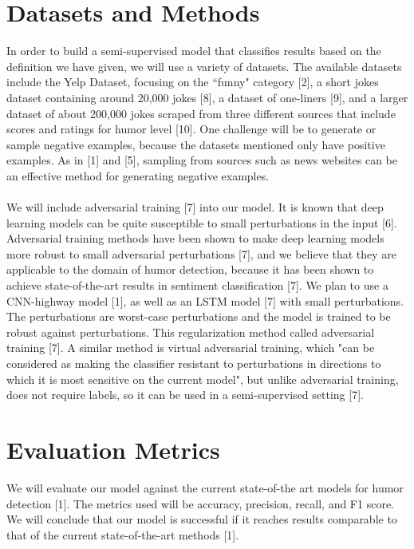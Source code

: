 \documentclass{article}
\begin{document}
\section{Datasets and Methods}
         In order to build a semi-supervised model that classifies results based on the definition we have given, we will use a variety of datasets. 
         The available datasets include the Yelp Dataset, focusing on the ``funny" category [2], a short jokes dataset containing around 20,000 jokes [8], a dataset of one-liners [9], and a larger dataset of about 200,000 jokes scraped from three different sources that include scores and ratings for humor level [10]. One challenge will be to generate or sample negative examples, because the datasets mentioned only have positive examples. As in [1] and [5], sampling from sources such as news websites can be an effective method for generating negative examples.
        \\\\
        We will include adversarial training [7] into our model. It is known that deep learning models can be quite susceptible to small perturbations in the input [6]. Adversarial training methods have been shown to make deep learning models more robust to small adversarial perturbations [7], and we believe that they are applicable to the domain of humor detection, because it has been shown to achieve state-of-the-art results in sentiment classification [7]. We plan to use a CNN-highway model [1], as well as an LSTM model [7] with small perturbations. The perturbations are worst-case perturbations and the model is trained to be robust against perturbations. This regularization method called adversarial training [7]. A similar method is virtual adversarial training, which "can be considered as making the classifier resistant to perturbations in directions to which it is most sensitive on the current model", but unlike adversarial training, does not require labels, so it can be used in a semi-supervised setting [7].

\section{Evaluation Metrics}
We will evaluate our model against the current state-of-the art models for humor detection [1]. The metrics used will be accuracy, precision, recall, and F1 score. We will conclude that our model is successful if it reaches results comparable to that of the current state-of-the-art methods [1].
\pagebreak
\end{document}
